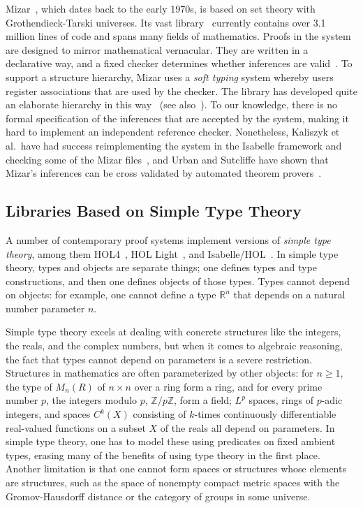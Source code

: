 \documentclass[sigplan]{acmart}\settopmatter{}
\begin{document}
Mizar~\cite{Banc15, Grab10}, which dates back to the early 1970s, is based on set theory with Grothendieck-Tarski universes.
Its vast library~\cite{Banc18} currently contains over 3.1 million lines of code and spans many fields of mathematics.
Proofs in the system are designed to mirror mathematical vernacular.
They are written in a declarative way, and a fixed checker determines whether inferences are valid~\cite{Grab10}.
To support a structure hierarchy, Mizar uses a \emph{soft typing} system whereby users register associations
that are used by the checker.
The library has developed quite an elaborate hierarchy in this way~\cite{Grab16} (see also~\cite{Grab10,Kali17}).
To our knowledge, there is no formal specification of the inferences that are accepted by the system,
making it hard to implement an independent reference checker.
Nonetheless, Kaliszyk et al.\ have had success reimplementing the system in the Isabelle framework and checking some of the Mizar files~\cite{Kali16, Kali17}, and Urban and Sutcliffe have shown that Mizar's inferences can be cross validated by automated theorem provers~\cite{Urb08}.

\subsection{Libraries Based on Simple Type Theory}

A number of contemporary proof systems implement versions of \emph{simple type theory}, among them HOL4~\cite{Slin08}, HOL Light~\cite{Harr09}, and Isabelle/HOL~\cite{Nipk02}.
In simple type theory, types and objects are separate things; one defines types and type constructions, and then one defines objects of those types.
Types cannot depend on objects: for example, one cannot define a type $\mathbb{R}^n$ that depends on a natural number parameter $n$.

Simple type theory excels at dealing with concrete structures like the integers, the reals, and the complex numbers,
but when it comes to algebraic reasoning, the fact that types cannot depend on parameters is a severe restriction.
Structures in mathematics are often parameterized by other objects: for $n \ge 1$, the type of $M_n(R)$ of $n \times n$ over a ring form a ring, and for every prime number $p$, the integers modulo $p$, $\mathbb{Z}/p\mathbb{Z}$, form a field; $L^p$ spaces, rings of $p$-adic integers, and spaces $C^k(X)$ consisting of $k$-times continuously differentiable real-valued functions on a subset $X$ of the reals all depend on parameters.
In simple type theory, one has to model these using predicates on fixed ambient types, erasing many of the benefits of using type theory in the first place.
Another limitation is that one cannot form spaces or structures whose elements are structures, such as the space of nonempty compact metric spaces with the Gromov-Hausdorff distance or the category of groups in some universe.
\end{document}
